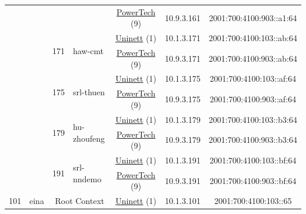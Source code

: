 \begin{small}
\begin{center}
\begin{longtable}{|c|c|c|c|c|c|c|c|}
  &  &  &  & \multicolumn{2}{|c|}{\tiny{\href{http://www.powertech.no}{PowerTech} (9)}} & \tiny{10.9.3.161} & \tiny{2001:700:4100:903::a1:64} \\* \cline{3-3}\cline{4-4}\cline{5-5}\cline{6-6}\cline{7-7}\cline{8-8}
  &  & \multirow{2}{*}{\tiny{171}} & \multicolumn{1}{|l|}{\multirow{2}{*}{\tiny{haw-cmt}}} & \multicolumn{2}{|c|}{\tiny{\href{https://www.uninett.no}{Uninett} (1)}} & \tiny{10.1.3.171} & \tiny{2001:700:4100:103::ab:64} \\* \cline{5-5}\cline{6-6}\cline{7-7}\cline{8-8}
  &  &  &  & \multicolumn{2}{|c|}{\tiny{\href{http://www.powertech.no}{PowerTech} (9)}} & \tiny{10.9.3.171} & \tiny{2001:700:4100:903::ab:64} \\* \cline{3-3}\cline{4-4}\cline{5-5}\cline{6-6}\cline{7-7}\cline{8-8}
  &  & \multirow{2}{*}{\tiny{175}} & \multicolumn{1}{|l|}{\multirow{2}{*}{\tiny{srl-thuen}}} & \multicolumn{2}{|c|}{\tiny{\href{https://www.uninett.no}{Uninett} (1)}} & \tiny{10.1.3.175} & \tiny{2001:700:4100:103::af:64} \\* \cline{5-5}\cline{6-6}\cline{7-7}\cline{8-8}
  &  &  &  & \multicolumn{2}{|c|}{\tiny{\href{http://www.powertech.no}{PowerTech} (9)}} & \tiny{10.9.3.175} & \tiny{2001:700:4100:903::af:64} \\* \cline{3-3}\cline{4-4}\cline{5-5}\cline{6-6}\cline{7-7}\cline{8-8}
  &  & \multirow{2}{*}{\tiny{179}} & \multicolumn{1}{|l|}{\multirow{2}{*}{\tiny{hu-zhoufeng}}} & \multicolumn{2}{|c|}{\tiny{\href{https://www.uninett.no}{Uninett} (1)}} & \tiny{10.1.3.179} & \tiny{2001:700:4100:103::b3:64} \\* \cline{5-5}\cline{6-6}\cline{7-7}\cline{8-8}
  &  &  &  & \multicolumn{2}{|c|}{\tiny{\href{http://www.powertech.no}{PowerTech} (9)}} & \tiny{10.9.3.179} & \tiny{2001:700:4100:903::b3:64} \\* \cline{3-3}\cline{4-4}\cline{5-5}\cline{6-6}\cline{7-7}\cline{8-8}
  &  & \multirow{2}{*}{\tiny{191}} & \multicolumn{1}{|l|}{\multirow{2}{*}{\tiny{srl-nndemo}}} & \multicolumn{2}{|c|}{\tiny{\href{https://www.uninett.no}{Uninett} (1)}} & \tiny{10.1.3.191} & \tiny{2001:700:4100:103::bf:64} \\* \cline{5-5}\cline{6-6}\cline{7-7}\cline{8-8}
  &  &  &  & \multicolumn{2}{|c|}{\tiny{\href{http://www.powertech.no}{PowerTech} (9)}} & \tiny{10.9.3.191} & \tiny{2001:700:4100:903::bf:64} \\ \hline
 \multirow{26}{*}{\tiny{101}} & \multicolumn{1}{|l|}{\multirow{26}{*}{\tiny{eina}}} & \multicolumn{2}{|c|}{\multirow{2}{*}{\tiny{Root Context}}} & \multicolumn{2}{|c|}{\tiny{\href{https://www.uninett.no}{Uninett} (1)}} & \tiny{10.1.3.101} & \tiny{2001:700:4100:103::65} \\* \cline{5-5}\cline{6-6}\cline{7-7}\cline{8-8}

\end{longtable}
\end{center}
\end{small}
